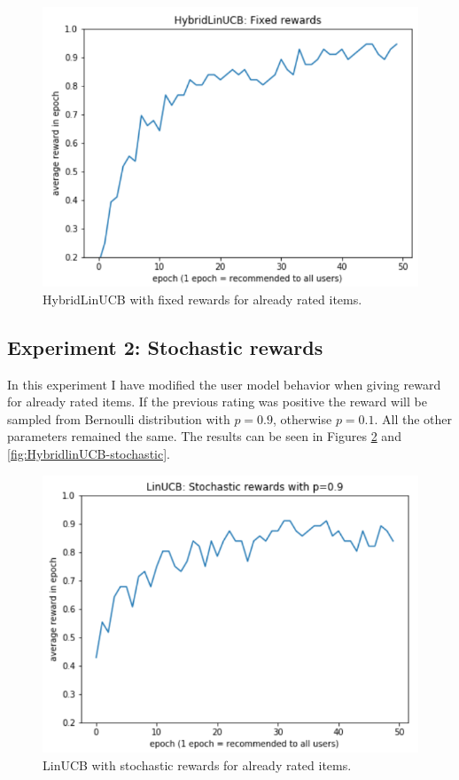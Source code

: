 \documentclass[12pt, titlepage]{article}
\begin{document}
\begin{figure}[h!]
 \centering
 \includegraphics[scale=0.5]{img/HybridLinUCB-fixed}
 \caption{HybridLinUCB with fixed rewards for already rated items. }
 \label{fig:HybridlinUCB-fixed}
\end{figure}



\subsection{Experiment 2: Stochastic rewards}
In this experiment I have modified the user model behavior when giving reward for already rated items.
If the previous rating was positive the reward will be sampled from Bernoulli distribution with $p=0.9$, otherwise $p=0.1$.
All the other parameters remained the same. The results can be seen in Figures \ref{fig:linUCB-stochastic} and \ref{fig:HybridlinUCB-stochastic}. 


\begin{figure}[h!]
 \centering
 \includegraphics[scale=0.5]{img/LinUCB-stochastic}
 \caption{LinUCB with stochastic rewards for already rated items.}
 \label{fig:linUCB-stochastic}
\end{figure}
\end{document}
